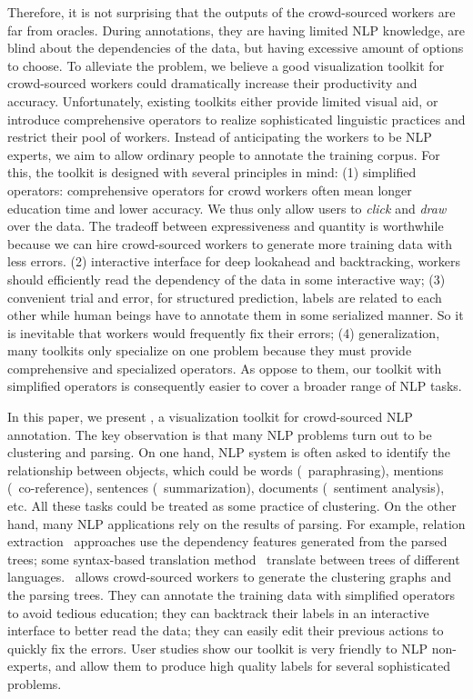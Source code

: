 Therefore, it is not surprising that the outputs of the crowd-sourced workers are far from oracles. During annotations, they are having limited NLP knowledge, are blind about the dependencies of the data, but having excessive amount of options to choose. To alleviate the problem, we believe a good visualization toolkit for crowd-sourced workers could dramatically increase their productivity and accuracy. Unfortunately, existing toolkits either provide limited visual aid, or introduce comprehensive operators to realize sophisticated linguistic practices and restrict their pool of workers. Instead of anticipating the workers to be NLP experts, we aim to allow ordinary people to annotate the training corpus. For this, the toolkit is designed with several principles in mind: (1) simplified operators: comprehensive operators for crowd workers often mean longer education time and lower accuracy. We thus only allow users to {\em click} and {\em draw} over the data. The tradeoff between expressiveness and quantity is worthwhile because we can hire crowd-sourced workers to generate more training data with less errors. (2) interactive interface for deep lookahead and backtracking, workers should efficiently read the dependency of the data in some interactive way; (3) convenient trial and error, for structured prediction, labels are related to each other while human beings have to annotate them in some serialized manner. So it is inevitable that workers would frequently fix their errors; (4) generalization, many toolkits only specialize on one problem because they must provide comprehensive and specialized operators. As oppose to them, our toolkit with simplified operators is consequently easier to cover a broader range of NLP tasks.

In this paper, we present \sys, a visualization toolkit for crowd-sourced NLP annotation. The key observation is that many NLP problems turn out to be clustering and parsing. On one hand, NLP system is often asked to identify the relationship between objects, which could be words (\eg\ paraphrasing), mentions (\eg\ co-reference), sentences (\eg\ summarization), documents (\eg\ sentiment analysis), etc. All these tasks could be treated as some practice of clustering. On the other hand, many NLP applications rely on the results of parsing. For example, relation extraction~\cite{hoffmann2011knowledge} approaches use the dependency features generated from the parsed trees; some syntax-based translation method~\cite{chiang2010learning} translate between trees of different languages. \sys\ allows crowd-sourced workers to generate the clustering graphs and the parsing trees. They can annotate the training data with simplified operators to avoid tedious education; they can backtrack their labels in an interactive interface to better read the data; they can easily edit their previous actions to quickly fix the errors. User studies show our toolkit is very friendly to NLP non-experts, and allow them to produce high quality labels for several sophisticated problems. 

